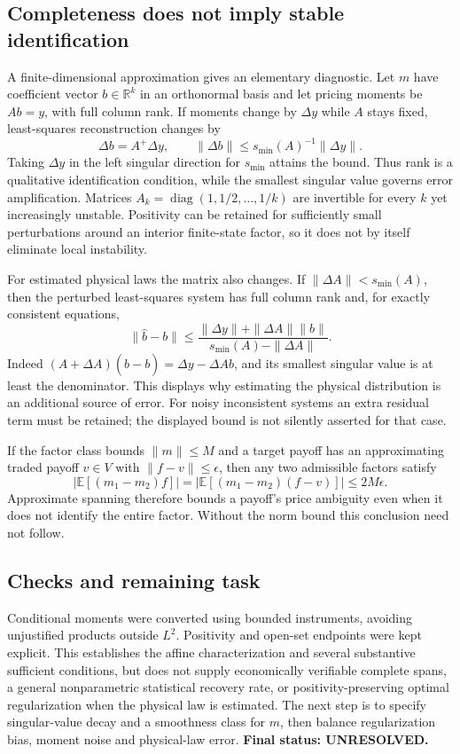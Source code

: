 \documentclass[11pt]{article}
\newcommand{\E}{\mathbb E}
\newcommand{\R}{\mathbb R}
\begin{document}
\subsection*{Completeness does not imply stable identification}
A finite-dimensional approximation gives an elementary diagnostic. Let
$m$ have coefficient vector $b\in\R^k$ in an orthonormal basis and let
pricing moments be $Ab=y$, with full column rank. If moments change by
$\Delta y$ while $A$ stays fixed, least-squares reconstruction changes by
\[
 \Delta b=A^+\Delta y,\qquad
 \|\Delta b\|\leq s_{\min}(A)^{-1}\|\Delta y\|.
\]
Taking $\Delta y$ in the left singular direction for $s_{\min}$ attains
the bound. Thus rank is a qualitative identification condition, while the
smallest singular value governs error amplification. Matrices
$A_k=\operatorname{diag}(1,1/2,\ldots,1/k)$ are invertible for every $k$
yet increasingly unstable. Positivity can be retained for sufficiently
small perturbations around an interior finite-state factor, so it does not
by itself eliminate local instability.

For estimated physical laws the matrix also changes. If
$\|\Delta A\|<s_{\min}(A)$, then the perturbed least-squares system has
full column rank and, for exactly consistent equations,
\[
 \|\widehat b-b\|
 \leq\frac{\|\Delta y\|+\|\Delta A\|\|b\|}
 {s_{\min}(A)-\|\Delta A\|}.
\]
Indeed $(A+\Delta A)(\widehat b-b)=\Delta y-\Delta A b$,
and its smallest singular value is at least the denominator. This displays
why estimating the physical distribution is an additional source of error.
For noisy inconsistent systems an extra residual term must be retained;
the displayed bound is not silently asserted for that case.

If the factor class bounds $\|m\|\leq M$ and a target payoff has an
approximating traded payoff $v\in V$ with $\|f-v\|\leq\epsilon$, then
any two admissible factors satisfy
\[
 |\E[(m_1-m_2)f]|=|\E[(m_1-m_2)(f-v)]|\leq2M\epsilon.
\]
Approximate spanning therefore bounds a payoff's price ambiguity even
when it does not identify the entire factor. Without the norm bound this
conclusion need not follow.

\subsection*{Checks and remaining task}
Conditional moments were converted using bounded instruments, avoiding
unjustified products outside $L^2$. Positivity and open-set endpoints were
kept explicit. This establishes the affine characterization and several
substantive sufficient conditions, but does not supply economically
verifiable complete spans, a general nonparametric statistical recovery
rate, or positivity-preserving optimal regularization when the physical
law is estimated. The next step is to specify singular-value decay and a
smoothness class for $m$, then balance regularization bias, moment noise
and physical-law error. \textbf{Final status: UNRESOLVED.}
\end{document}
